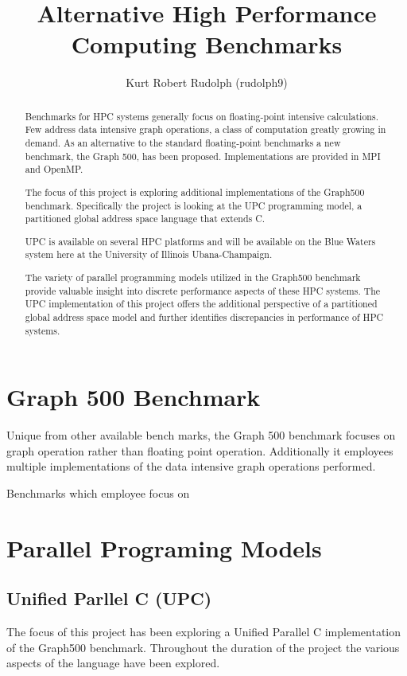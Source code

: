 \documentclass[11pt]{amsart}
\title{Alternative High Performance Computing Benchmarks}
\author{Kurt Robert Rudolph (rudolph9)}
\date{}
\begin{document}
\maketitle
\begin{abstract}
Benchmarks for HPC systems generally focus on floating-point intensive calculations.  Few address data intensive graph operations, a class of computation greatly growing in demand.  As an alternative to the standard floating-point benchmarks a new benchmark, the Graph 500, has been proposed.  Implementations are provided in MPI and OpenMP.  

The focus of this project is exploring additional implementations of the Graph500 benchmark.  Specifically the project is looking at the UPC programming model, a partitioned global address space language that extends C.  

UPC is available on several HPC platforms and will be available on the Blue Waters system here at the University of Illinois Ubana-Champaign.

The variety of parallel programming models utilized in the Graph500 benchmark provide valuable insight into discrete performance aspects of these HPC systems.  The UPC implementation of this project offers the additional perspective of a partitioned global address space model and further identifies discrepancies in performance of HPC systems.  
\end{abstract}
\section{Graph 500 Benchmark}
	Unique from other available bench marks, the Graph 500 benchmark focuses on graph operation rather than floating point operation.  Additionally it employees multiple implementations of the data intensive graph operations performed.

	Benchmarks which employee focus on 
\section{Parallel Programing Models}

\subsection{Unified Parllel C (UPC)}
	The focus of this project has been exploring a Unified Parallel C implementation of the Graph500 benchmark.  Throughout the duration of the project the various aspects of the language have been explored.  
\end{document}
